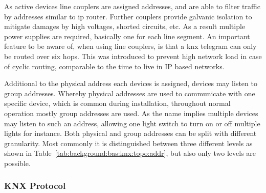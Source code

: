 

As active devices line couplers are assigned addresses, and are able to filter traffic by addresses similar to \gls{ip} router. %
Further couplers provide galvanic isolation to mitigate damages by high voltages, shorted circuits, etc. As a result multiple power supplies are required, basically one for each line segment.
An important feature to be aware of, when using line couplers, is that a \gls{knx} telegram can only be routed over six hops. This was introduced to prevent high network load in case of cyclic routing, comparable to the time to live in IP based networks. \parencite{Sokollik2017}


\newpage
Additional to the physical address each devices is assigned, devices may listen to group addresses.
Whereby physical addresses are used to communicate with one specific device, which is common during installation, throughout normal operation mostly group addresses are used. As the name implies multiple devices may listen to such an address, allowing one light switch to turn on or off multiple lights for instance.
Both physical and group addresses can be split with different granularity. Most commonly it is distinguished between three different levels as shown in Table~\ref{tab:background:bas:knx:topo:addr}, but also only two levels are possible.

\subsubsection{KNX Protocol}
\label{sec:background:bas:knx:proto}

